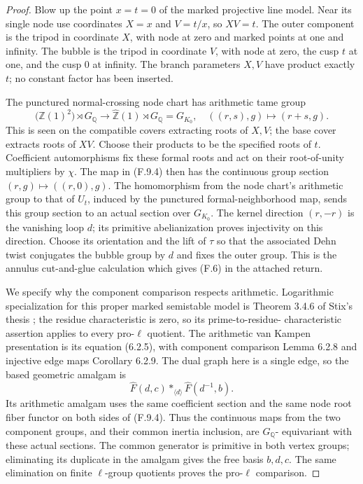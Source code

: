 \begin{proof}
Blow up the point $x=t=0$ of the marked projective
line model.  Near its single node use coordinates
$X=x$ and $V=t/x$, so $XV=t$.
The outer component is the tripod in coordinate
$X$, with node at zero and marked points at one
and infinity.  The bubble is the tripod in
coordinate $V$, with node at zero, the cusp $t$
at one, and the cusp $0$ at infinity.
The branch parameters $X,V$ have product exactly
$t$; no constant factor has been inserted.

The punctured normal-crossing node chart has
arithmetic tame group
\[
 \bigl(\widehat{\mathbb Z}(1)^2\bigr)\rtimes G_{\mathbb Q}
 \longrightarrow
 \widehat{\mathbb Z}(1)\rtimes G_{\mathbb Q}=G_{K_0},
 \quad ((r,s),g)\longmapsto(r+s,g).                         \tag{F.9.4}
\]
This is seen on the compatible covers extracting
roots of $X,V$; the base cover extracts roots of
$XV$.  Choose their products to be the specified
roots of $t$.  Coefficient automorphisms fix these
formal roots and act on their root-of-unity
multipliers by $\chi$.  The map in (F.9.4) then has
the continuous group section
$(r,g)\mapsto((r,0),g)$.
The homomorphism from the node chart's arithmetic
group to that of $U_t$, induced by the punctured
formal-neighborhood map, sends this group section
to an actual section over $G_{K_0}$.
The kernel direction $(r,-r)$ is the vanishing
loop $d$; its primitive abelianization proves
injectivity on this direction.  Choose its
orientation and the lift of $\tau$ so that the
associated Dehn twist conjugates the bubble
group by $d$ and fixes the outer group.
This is the annulus cut-and-glue calculation
which gives (F.6) in the attached return.

We specify why the component comparison respects
arithmetic.  Logarithmic specialization for this
proper marked semistable model is Theorem 3.4.6
of Stix's thesis \cite{BC_Stix2002}; the residue
characteristic is zero, so its prime-to-residue-
characteristic assertion applies to every
pro-$\ell$ quotient.  The arithmetic van Kampen
presentation is its equation (6.2.5), with
component comparison Lemma 6.2.8 and injective
edge maps Corollary 6.2.9.  The dual graph here
is a single edge, so the based geometric
amalgam is
\[
 \widehat F(d,c)*_{\langle d\rangle}
                     \widehat F(d^{-1},b).                 \tag{F.9.5}
\]
Its arithmetic amalgam uses the same coefficient
section and the same node root fiber functor
on both sides of (F.9.4).  Thus the continuous
maps from the two component groups, and their
common inertia inclusion, are $G_{\mathbb Q}$-
equivariant with these actual sections.
The common generator is primitive in both
vertex groups; eliminating its duplicate in
the amalgam gives the free basis $b,d,c$.
The same elimination on finite $\ell$-group
quotients proves the pro-$\ell$ comparison.


\end{proof}
